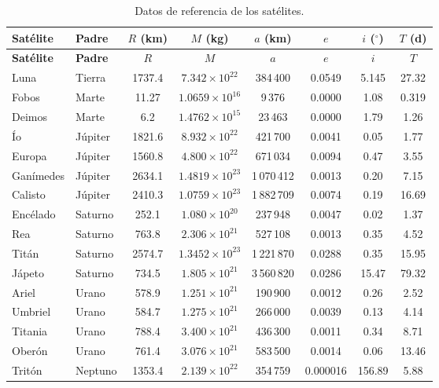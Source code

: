 \documentclass[11pt,a4paper]{article}
\theoremstyle{definition}
\begin{document}
\begin{longtable}{@{}llcccccc@{}}
\caption{Datos de referencia de los satélites.} \\
\toprule
\textbf{Satélite} & \textbf{Padre} & $R$ (\si{\kilo\metre}) & $M$ (\si{\kilo\gram}) & $a$ (\si{\kilo\metre}) & $e$ & $i$ ($^{\circ}$) & $T$ (\si{\day}) \\
\midrule
\endfirsthead
\toprule
\textbf{Satélite} & \textbf{Padre} & $R$ & $M$ & $a$ & $e$ & $i$ & $T$ \\
\midrule
\endhead
Luna      & Tierra  & 1737.4 & $7.342\times10^{22}$ & 384\,400   & 0.0549  & 5.145   & 27.32 \\
Fobos     & Marte   & 11.27  & $1.0659\times10^{16}$ & 9\,376    & 0.0000  & 1.08    & 0.319 \\
Deimos    & Marte   & 6.2    & $1.4762\times10^{15}$ & 23\,463   & 0.0000  & 1.79    & 1.26 \\
Ío        & Júpiter & 1821.6 & $8.932\times10^{22}$ & 421\,700   & 0.0041  & 0.05    & 1.77 \\
Europa    & Júpiter & 1560.8 & $4.800\times10^{22}$ & 671\,034   & 0.0094  & 0.47    & 3.55 \\
Ganímedes & Júpiter & 2634.1 & $1.4819\times10^{23}$ & 1\,070\,412 & 0.0013  & 0.20    & 7.15 \\
Calisto   & Júpiter & 2410.3 & $1.0759\times10^{23}$ & 1\,882\,709 & 0.0074  & 0.19    & 16.69 \\
Encélado  & Saturno & 252.1  & $1.080\times10^{20}$ & 237\,948   & 0.0047  & 0.02    & 1.37 \\
Rea       & Saturno & 763.8  & $2.306\times10^{21}$ & 527\,108   & 0.0013  & 0.35    & 4.52 \\
Titán     & Saturno & 2574.7 & $1.3452\times10^{23}$ & 1\,221\,870 & 0.0288  & 0.35    & 15.95 \\
Jápeto    & Saturno & 734.5  & $1.805\times10^{21}$ & 3\,560\,820 & 0.0286  & 15.47   & 79.32 \\
Ariel     & Urano   & 578.9  & $1.251\times10^{21}$ & 190\,900   & 0.0012  & 0.26    & 2.52 \\
Umbriel   & Urano   & 584.7  & $1.275\times10^{21}$ & 266\,000   & 0.0039  & 0.13    & 4.14 \\
Titania   & Urano   & 788.4  & $3.400\times10^{21}$ & 436\,300   & 0.0011  & 0.34    & 8.71 \\
Oberón    & Urano   & 761.4  & $3.076\times10^{21}$ & 583\,500   & 0.0014  & 0.06    & 13.46 \\
Tritón    & Neptuno & 1353.4 & $2.139\times10^{22}$ & 354\,759   & 0.000016 & 156.89 & 5.88 \\
\bottomrule
\end{longtable}
\end{document}
